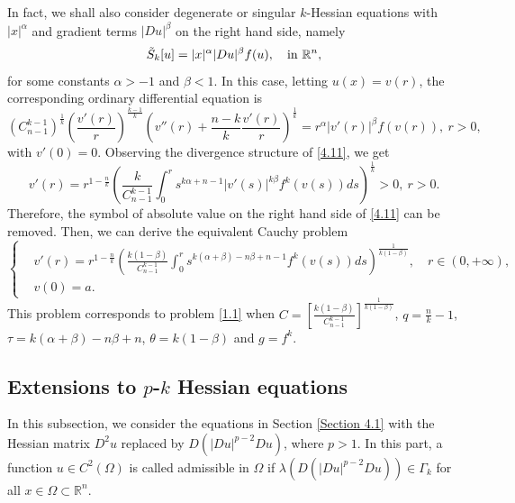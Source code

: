 \documentclass[a4paper,11pt]{amsart}
\theoremstyle{plain}
\theoremstyle{remark}
\numberwithin{equation}{section}
\numberwithin{figure}{section}
\numberwithin{remark}{section}
\begin{document}
\begin{sloppypar}
	In fact, we shall also consider degenerate or singular $k$-Hessian equations with $|x|^\alpha$ and gradient terms $|Du|^\beta$ on the right hand side, namely
	\begin{equation}\label{4.10}
	\tilde S_k [u] = |x|^\alpha |Du|^\beta f(u), \quad {\rm in} \ \mathbb{R}^n,
	\end{equation}
for some constants $\alpha>-1$ and $\beta<1$. In this case, letting $u(x)=v(r)$, the corresponding ordinary differential equation is
	\begin{equation}\label{4.11}
	\left(C_{n-1}^{k-1}\right)^{\frac{1}{k}}\left(\frac{v'(r)}{r}\right)^{\frac{k-1}{k}}\left(v''(r)+\frac{n-k}{k}\frac{v'(r)}{r}\right)^\frac{1}{k} = r^\alpha |v'(r)|^\beta f(v(r)), \ r>0,
	\end{equation}
with $v'(0)=0$. Observing the divergence structure of \eqref{4.11}, we get
	\begin{equation}\label{4.12}
	v'(r)= r^{1-\frac{n}{k}}  \left( \frac{k}{C_{n-1}^{k-1}} \int_{0}^{r} s^{k\alpha +n-1} |v'(s)|^{k\beta} f^{k} (v(s))ds \right )^{\frac{1}{k}}>0, \ r>0.
	\end{equation}
Therefore, the symbol of absolute value on the right hand side of \eqref{4.11} can be removed. Then, we can derive the equivalent Cauchy problem
	\begin{equation}\label{4.13}
	\left\{
	\begin{aligned}
	&v'(r)= r^{1-\frac{n}{k}}  \left( \frac{k(1-\beta)}{C_{n-1}^{k-1}} \int_{0}^{r} s^{k(\alpha+\beta) -n\beta+n-1} f^{k} (v(s))ds \right )^{\frac{1}{k(1-\beta)}}, \quad r\in (0, +\infty), \\
	&v(0)=a.
	\end{aligned}
	\right.
	\end{equation}
This problem corresponds to problem \eqref{1.1} when $C=\left[ \frac{k(1-\beta)}{C_{n-1}^{k-1}} \right]^{\frac{1}{k(1-\beta)}} $, $q=\frac{n}{k}-1$, $\tau =k(\alpha+\beta)-n\beta+n$, $\theta = k(1-\beta)$ and $g=f^k$.


\subsection{Extensions to $p$-$k$ Hessian equations}\label{Section 4.2}
In this subsection, we consider the equations in Section \ref{Section 4.1} with the Hessian matrix $D^2u$ replaced by $D(|Du|^{p-2}Du)$, where $p> 1$. In this part, a function $u\in C^2(\Omega)$ is called admissible in $\Omega$ if $\lambda(D(|Du|^{p-2}Du))\in \Gamma_{k}$ for all $x\in \Omega\subset \mathbb{R}^n$.




\end{sloppypar}
\end{document}
